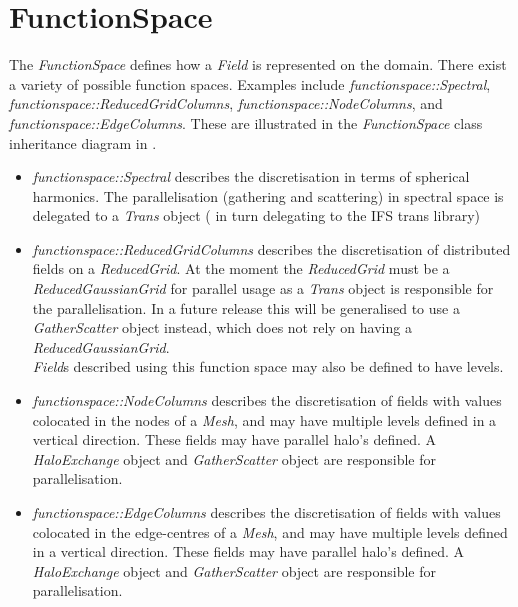 \section{FunctionSpace} \label{s:functionspace}
%
The \emph{FunctionSpace} defines how a \emph{Field} is represented on the
domain. There exist a variety of possible function spaces. Examples include 
\emph{functionspace::Spectral}, \emph{functionspace::ReducedGridColumns}, \emph{functionspace::NodeColumns}, and \emph{functionspace::EdgeColumns}.
These are illustrated in the \emph{FunctionSpace} class inheritance diagram in .
\begin{itemize}
  \item \emph{functionspace::Spectral} describes the discretisation in terms of         spherical harmonics. The parallelisation (gathering and scattering) in
        spectral space is delegated to a \emph{Trans} object ( in turn
        delegating to the IFS trans library)
  \item \emph{functionspace::ReducedGridColumns} describes the discretisation
        of distributed fields on a \emph{ReducedGrid}. At the moment the
        \emph{ReducedGrid} must be a \emph{ReducedGaussianGrid} for parallel
         usage as a \emph{Trans} object is responsible for the parallelisation.
        In a future release this will be generalised to use a 
        \emph{GatherScatter} object instead, which does not rely on having a 
        \emph{ReducedGaussianGrid}.\\
        \emph{Field}s described using this function space may also be defined  
        to have levels.
  \item \emph{functionspace::NodeColumns} describes the discretisation of fields
        with values colocated in the nodes of a \emph{Mesh}, and may have
        multiple levels defined in a vertical direction. These fields may have
        parallel halo's defined. A \emph{HaloExchange} object and
        \emph{GatherScatter} object are responsible for parallelisation.
  \item \emph{functionspace::EdgeColumns} describes the discretisation of fields
        with values colocated in the edge-centres of a \emph{Mesh}, and may have
        multiple levels defined in a vertical direction. These fields may have
        parallel halo's defined. A \emph{HaloExchange} object and
        \emph{GatherScatter} object are responsible for parallelisation.
\end{itemize}
%
